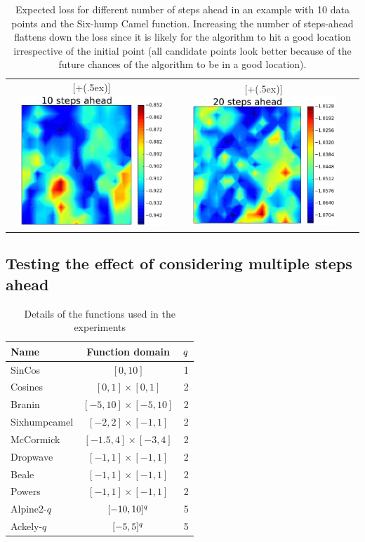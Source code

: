 \documentclass[twoside]{article}
\newcommand*{\addheight}[2][.5ex]{%
  \raisebox{0pt}[\dimexpr\height+(#1)\relax]{#2}%
}
\begin{document}
\begin{table}[t!]
\begin{tabular}{ccc}
      \addheight{\includegraphics[width=54mm]{10_ahead.pdf}}  &
      \addheight{\includegraphics[width=54mm]{20_ahead.pdf}}\\
\end{tabular}\caption{Expected loss for different number of steps ahead in an example with 10 data points and the Six-hump Camel function. Increasing the number of steps-ahead flattens down the loss since it is likely for the algorithm to hit a good location irrespective of the initial point (all candidate points look better because of the future chances of the algorithm to be in a good location).}\label{table:n_ahead}
\end{table}

\subsection{Testing the effect of considering multiple steps ahead}

\begin{table}[t!]
\begin{center}
\begin{tabular}{lcc}
\toprule
Name &Function domain & $q$ \\
\midrule
\hline
SinCos & $[0,10]$ & 1 \\
Cosines & $[0,1]\times[0,1]$ & 2\\
Branin &$[-5,10]\times[-5,10]$ & 2\\
Sixhumpcamel  &$[-2,2]\times[-1,1]$ & 2\\
McCormick  & $[-1.5,4]\times[-3,4]$& 2\\
Dropwave   &$[-1,1]\times[-1,1]$ & 2\\
Beale   &$[-1,1]\times[-1,1]$ & 2\\
Powers  & $[-1,1]\times[-1,1]$& 2\\ %
Alpine2-$q$  & $[-10,10]^{q}$& 5\\
Ackely-$q$  &$[-5,5]^{q}$ & 5\\
\bottomrule
\end{tabular}\caption{Details of the functions used in the experiments}\label{table:test_functions}
\end{center}
\end{table}
\end{document}
